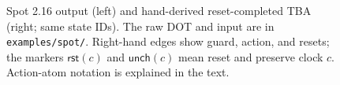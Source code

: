 \begin{figure}[!t]
\centering
\resizebox{\textwidth}{!}{}
\caption{Spot 2.16 output (left) and hand-derived reset-completed
TBA (right; same state IDs). The raw DOT and input are in
\texttt{examples/spot/}. Right-hand edges show guard, action, and resets; the
markers $\mathsf{rst}(c)$ and $\mathsf{unch}(c)$ mean reset and preserve clock
$c$. Action-atom notation is explained in the text.}
\label{fig:translation-steps45}
\end{figure}
